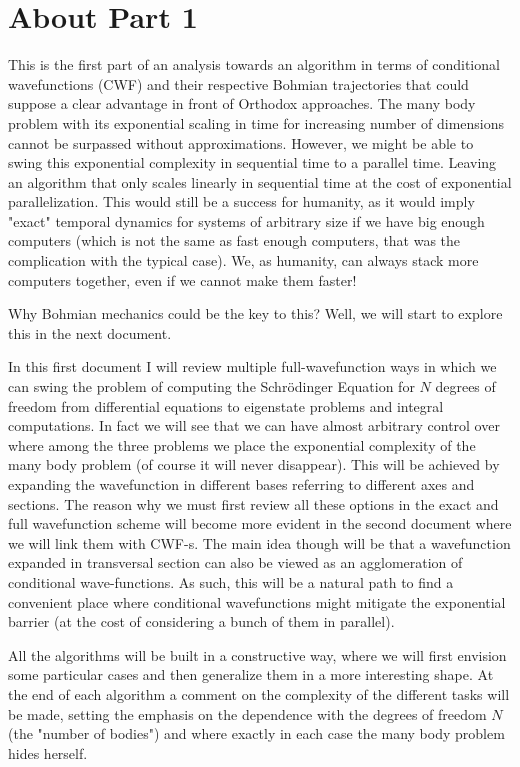 \documentclass[11pt, a4paper]{article} %
\begin{document}
%
\section*{About Part 1}

This is the first part of an analysis towards an algorithm in terms of conditional wavefunctions (CWF) and their respective Bohmian trajectories that could suppose a clear advantage in front of Orthodox approaches. The many body problem with its exponential scaling in time for increasing number of dimensions cannot be surpassed without approximations. However, we might be able to swing this exponential complexity in sequential time to a parallel time. Leaving an algorithm that only scales linearly in sequential time at the cost of exponential parallelization. This would still be a success for humanity, as it would imply "exact" temporal dynamics for systems of arbitrary size if we have big enough computers (which is not the same as fast enough computers, that was the complication with the typical case). We, as humanity, can always stack more computers together, even if we cannot make them faster!

Why Bohmian mechanics could be the key to this? Well, we will start to explore this in the next document.

In this first document I will review multiple full-wavefunction ways in which we can swing the problem of computing the Schrödinger Equation for $N$ degrees of freedom from differential equations to eigenstate problems and integral computations. In fact we will see that we can have almost arbitrary control over where among the three problems we place the exponential complexity of the many body problem (of course it will never disappear). This will be achieved by expanding the wavefunction in different bases referring to different axes and sections. The reason why we must first review all these options in the exact and full wavefunction scheme will become more evident in the second document where we will link them with CWF-s. The main idea though will be that a wavefunction expanded in transversal section can also be viewed as an agglomeration of conditional wave-functions. As such, this will be a natural path to find a convenient place where conditional wavefunctions might mitigate the exponential barrier (at the cost of considering a bunch of them in parallel).

All the algorithms will be built in a constructive way, where we will first envision some particular cases and then generalize them in a more interesting shape. At the end of each algorithm a comment on the complexity of the different tasks will be made, setting the emphasis on the dependence with the degrees of freedom $N$ (the "number of bodies") and where exactly in each case the many body problem hides herself.
\end{document}
